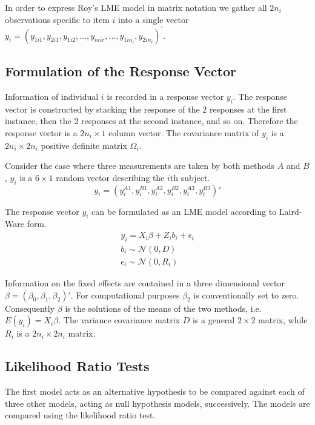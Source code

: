 \documentclass[12pt, a4paper]{report}
\theoremstyle{plain}
\theoremstyle{definition}
\theoremstyle{remark}
\begin{document}
	In order to express Roy's LME model in matrix notation we gather all $2n_i$ observations specific to item $i$ into a single vector  ${y}_{i} = (y_{1i1},y_{2i1},y_{1i2},\ldots,y_{mir},\ldots,y_{1in_{i}},y_{2in_{i}})^\prime.$ 
	
	\subsection{Formulation of the Response Vector}
	Information of individual $i$ is recorded in a response vector ${y}_{i}$. The response vector is constructed by stacking the response of the $2$ responses at the first instance, then the $2$ responses at the second instance, and so on. Therefore the response vector is a $2n_{i} \times 1$ column vector.
	The covariance matrix of ${y_{i}}$ is a $2n_{i} \times 2n_{i}$ positive definite matrix ${\Omega}_{i}$.
	
	Consider the case where three measurements are taken by both methods $A$ and $B$, ${y}_{i}$ is a $6 \times 1$ random vector describing the $i$th subject.
	\[
	{y}_{i} = (y_{i}^{A1},y_{i}^{B1},y_{i}^{A2},y_{i}^{B2},y_{i}^{A3},y_{i}^{B3}) \prime
	\]
	
	The response vector ${y_{i}}$ can be formulated as an LME model according to Laird-Ware form.
	\begin{eqnarray*}
		{y_{i}} = {X_{i}\beta}  + {Z_{i}b_{i}} + {\epsilon_{i}}\\
		{b_{i}} \sim \mathcal{N}({0,D})\\
		{\epsilon_{i}} \sim \mathcal{N}({0,R_{i}})
	\end{eqnarray*}
	
	Information on the fixed effects are contained in a three dimensional vector ${\beta} = (\beta_{0},\beta_{1},\beta_{2})\prime$. For computational purposes $\beta_{2}$ is conventionally set to zero. Consequently ${\beta}$ is the solutions of the means of the two methods, i.e. $E({y}_{i})  = {X}_{i}{\beta}$. The variance covariance matrix ${D}$ is a general $2 \times 2$ matrix, while ${R}_{i}$ is a $2n_{i} \times 2n_{i}$ matrix.
	
	
	\subsection{Likelihood Ratio Tests}	
	The first model acts as an alternative hypothesis to be compared against each of three other models, acting as null hypothesis models, successively. The models are compared using the likelihood ratio test. 
	
\end{document}
